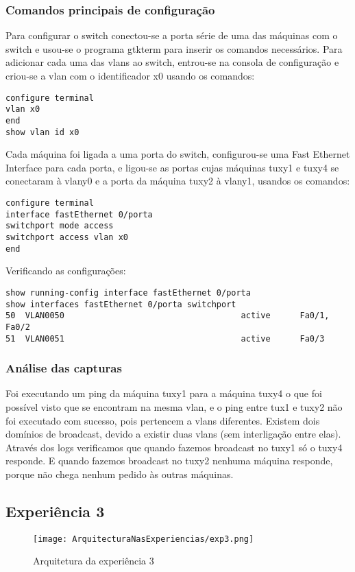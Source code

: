 \documentclass[a4paper]{article}
\begin{document}
\subsubsection{Comandos principais de configuração}
Para configurar o switch conectou-se a porta série de uma das máquinas com o switch e usou-se o programa gtkterm para inserir os comandos necessários.
Para adicionar cada uma das vlans ao switch, entrou-se na consola de configuração e criou-se a vlan com o identificador x0 usando os comandos:
\begin{verbatim}
configure terminal
vlan x0
end
show vlan id x0
\end{verbatim}
Cada máquina foi ligada a uma porta do switch, configurou-se uma Fast Ethernet Interface para cada porta, e ligou-se as portas cujas máquinas tuxy1 e tuxy4 se conectaram à vlany0 e a porta da máquina tuxy2 à vlany1, usandos os comandos:
\begin{verbatim}
configure terminal
interface fastEthernet 0/porta
switchport mode access
switchport access vlan x0
end
\end{verbatim}
Verificando as configurações:
\begin{verbatim}
show running-config interface fastEthernet 0/porta
show interfaces fastEthernet 0/porta switchport
50	VLAN0050									active		Fa0/1, Fa0/2
51 	VLAN0051									active		Fa0/3
\end{verbatim}

\subsubsection{Análise das capturas}
Foi executando um ping da máquina tuxy1 para a máquina tuxy4 o que foi possível visto que se encontram na mesma vlan, e o ping entre tux1 e tuxy2 não foi executado com sucesso, pois pertencem a vlans diferentes.
Existem dois domínios de broadcast, devido a existir duas vlans (sem interligação entre elas).
Através dos logs verificamos que quando fazemos broadcast no tuxy1 só o tuxy4 responde. E quando
fazemos broadcast no tuxy2 nenhuma máquina responde, porque não chega nenhum pedido às
outras máquinas.

\subsection{Experiência 3}

\begin{figure}[h]
    \centering
    \texttt{[image: ArquitecturaNasExperiencias/exp3.png]}
    \caption{Arquitetura da experiência 3}
\end{figure}
\end{document}
